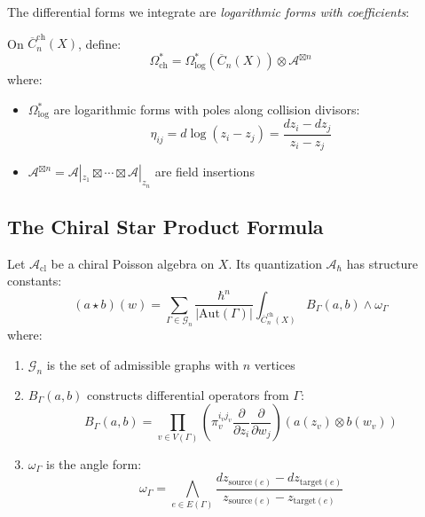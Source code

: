 The differential forms we integrate are \emph{logarithmic forms with coefficients}:

\begin{definition}
On $\overline{C}_n^{\text{ch}}(X)$, define:
$$\Omega^*_{\text{ch}} = \Omega^*_{\text{log}}(\overline{C}_n(X)) \otimes \mathcal{A}^{\boxtimes n}$$
where:
\begin{itemize}
\item $\Omega^*_{\text{log}}$ are logarithmic forms with poles along collision divisors:
$$\eta_{ij} = d\log(z_i - z_j) = \frac{dz_i - dz_j}{z_i - z_j}$$
\item $\mathcal{A}^{\boxtimes n} = \mathcal{A}|_{z_1} \boxtimes \cdots \boxtimes \mathcal{A}|_{z_n}$ are field insertions
\end{itemize}
\end{definition}

\subsection{The Chiral Star Product Formula}

\begin{theorem}
Let $\mathcal{A}_{\text{cl}}$ be a chiral Poisson algebra on $X$. Its quantization $\mathcal{A}_\hbar$ has structure constants:
$$(a \star b)(w) = \sum_{\Gamma \in \mathcal{G}_n} \frac{\hbar^{n}}{|\text{Aut}(\Gamma)|} \int_{\overline{C}_n^{\text{ch}}(X)} B_\Gamma(a,b) \wedge \omega_\Gamma$$
where:
\begin{enumerate}
\item $\mathcal{G}_n$ is the set of admissible graphs with $n$ vertices
\item $B_\Gamma(a,b)$ constructs differential operators from $\Gamma$:
$$B_\Gamma(a,b) = \prod_{v \in V(\Gamma)} \left(\pi_v^{i_v j_v} \frac{\partial}{\partial z_i} \frac{\partial}{\partial w_j}\right) (a(z_v) \otimes b(w_v))$$
\item $\omega_\Gamma$ is the angle form:
$$\omega_\Gamma = \bigwedge_{e \in E(\Gamma)} \frac{dz_{\text{source}(e)} - dz_{\text{target}(e)}}{z_{\text{source}(e)} - z_{\text{target}(e)}}$$
\end{enumerate}
\end{theorem}


